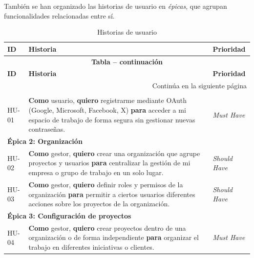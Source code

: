 También se han organizado las historias de usuario en \emph{épicas}, que agrupan funcionalidades relacionadas entre sí.

\begingroup
\renewcommand{\arraystretch}{1.3}

\begin{longtable}{|p{1.5cm}|p{9cm}|p{3cm}|}
\caption{Historias de usuario}\label{tab:historias}\\

\hline
\textbf{ID} & \textbf{Historia} & \textbf{Prioridad} \\
\hline

\endfirsthead

\multicolumn{3}{|c|}{\textbf{Tabla \thetable{} -- continuación}} \\
\hline
\textbf{ID} & \textbf{Historia} & \textbf{Prioridad} \\
\hline
\endhead

\hline
\multicolumn{3}{|r|}{Continúa en la siguiente página} \\
\hline
\endfoot

\hline
\endlastfoot

\multicolumn{3}{|l|}{\cellcolor{gray!15}\textbf{Épica 1: Identidad y acceso}} \\
\hline

HU-01 &
\textbf{Como} usuario, \textbf{quiero} registrarme mediante OAuth
(Google, Microsoft, Facebook, X)
\textbf{para} acceder a mi espacio de trabajo de forma segura sin gestionar nuevas contraseñas.
& \emph{Must Have} \\
\hline

\multicolumn{3}{|l|}{\cellcolor{gray!15}\textbf{Épica 2: Organización}} \\
\hline

HU-02 &
\textbf{Como} gestor, \textbf{quiero} crear una organización que agrupe proyectos y usuarios
\textbf{para} centralizar la gestión de mi empresa o grupo de trabajo en un solo lugar.
& \emph{Should Have} \\
\hline

HU-03 &
\textbf{Como} gestor, \textbf{quiero} definir roles y permisos de la organización
\textbf{para} permitir a ciertos usuarios diferentes acciones sobre los proyectos de la organización.
& \emph{Should Have} \\
\hline

\multicolumn{3}{|l|}{\cellcolor{gray!15}\textbf{Épica 3: Configuración de proyectos}} \\
\hline

HU-04 &
\textbf{Como} gestor, \textbf{quiero} crear proyectos dentro de una organización o de forma independiente
\textbf{para} organizar el trabajo en diferentes iniciativas o clientes.
& \emph{Must Have} \\
\hline


\end{longtable}
